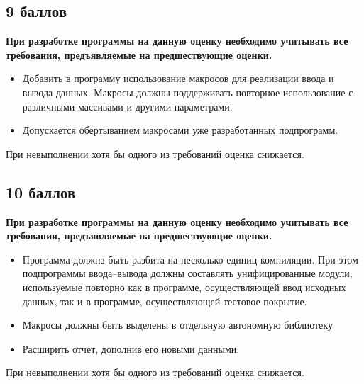 \documentclass[a4paper, 12pt, oneside]{article}
\begin{document}
\subsection*{9 баллов}

\textbf{При разработке программы на данную оценку необходимо учитывать все требования, предъявляемые на предшествующие оценки.}

\begin{itemize}
    \item Добавить в программу использование макросов для реализации ввода и вывода данных. Макросы должны поддерживать повторное использование с различными массивами и другими параметрами.
    \item Допускается обертыванием макросами уже разработанных подпрограмм.
\end{itemize}
При невыполнении хотя бы одного из требований оценка снижается.

\subsection*{10 баллов}

\textbf{При разработке программы на данную оценку необходимо учитывать все требования, предъявляемые на предшествующие оценки.}

\begin{itemize}
    \item Программа должна быть разбита на несколько единиц компиляции. При этом подпрограммы ввода--вывода должны составлять унифицированные модули, используемые повторно как в программе, осуществляющей ввод исходных данных, так и в программе, осуществляющей тестовое покрытие.
    \item Макросы должны быть выделены в отдельную автономную библиотеку
    \item Расширить отчет, дополнив его новыми данными.
\end{itemize}
При невыполнении хотя бы одного из требований оценка снижается.
\end{document}
